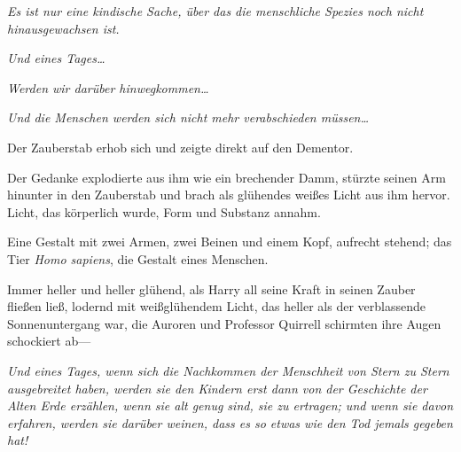 \emph{Es ist nur eine kindische Sache, über das die menschliche Spezies noch nicht hinausgewachsen ist.}

\emph{Und eines Tages…}

\emph{Werden wir darüber hinwegkommen…}

\emph{Und die Menschen werden sich nicht mehr verabschieden müssen…}

Der Zauberstab erhob sich und zeigte direkt auf den Dementor.


Der Gedanke explodierte aus ihm wie ein brechender Damm, stürzte seinen Arm hinunter in den Zauberstab und brach als glühendes weißes Licht aus ihm hervor. Licht, das körperlich wurde, Form und Substanz annahm.

Eine Gestalt mit zwei Armen, zwei Beinen und einem Kopf, aufrecht stehend; das Tier \emph{Homo sapiens}, die Gestalt eines Menschen.

Immer heller und heller glühend, als Harry all seine Kraft in seinen Zauber fließen ließ, lodernd mit weißglühendem Licht, das heller als der verblassende Sonnenuntergang war, die Auroren und Professor Quirrell schirmten ihre Augen schockiert ab—

\emph{Und eines Tages, wenn sich die Nachkommen der Menschheit von Stern zu Stern ausgebreitet haben, werden sie den Kindern erst dann von der Geschichte der Alten Erde erzählen, wenn sie alt genug sind, sie zu ertragen; und wenn sie davon erfahren, werden sie darüber weinen, dass es so etwas wie den Tod jemals gegeben hat!}

